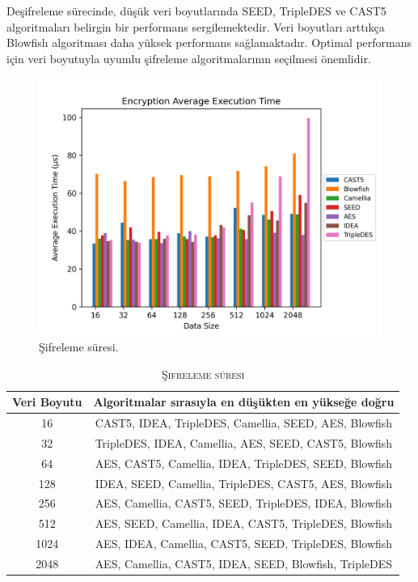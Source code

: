 \documentclass[conference, a4paper]{IEEEtran}
\begin{document}
    Deşifreleme sürecinde, düşük veri boyutlarında SEED, TripleDES ve CAST5 algoritmaları belirgin bir performans sergilemektedir. Veri boyutları arttıkça Blowfish algoritması daha yüksek performans sağlamaktadır. Optimal performans için veri boyutuyla uyumlu şifreleme algoritmalarının seçilmesi önemlidir.

    \begin{figure}[H]
    \centering
    \shorthandoff{=}  
    \includegraphics[scale=0.52]{fig7.png}
    \shorthandon{=} 
    \caption{Şifreleme süresi.}
    \label{sekil7}
    \end{figure}

    \begin{table}[h]
        \centering
        \caption{\textsc{Şifreleme süresi}}
        \label{tablo4}
        \begin{tabular}{|c|c|}
            \hline
                Veri Boyutu & Algoritmalar sırasıyla en düşükten en yükseğe doğru \\
            \hline
            16 & CAST5, IDEA, TripleDES, Camellia, SEED, AES, Blowfish \\
            \hline
            32 & TripleDES, IDEA, Camellia, AES, SEED, CAST5, Blowfish \\
            \hline
            64 & AES, CAST5, Camellia, IDEA, TripleDES, SEED, Blowfish \\
            \hline
            128 & IDEA, SEED, Camellia, TripleDES, CAST5, AES, Blowfish \\
            \hline
            256 & AES, Camellia, CAST5, SEED, TripleDES, IDEA, Blowfish \\
            \hline
            512 & AES, SEED, Camellia, IDEA, CAST5, TripleDES, Blowfish \\
            \hline
            1024 & AES, IDEA, Camellia, CAST5, SEED, TripleDES, Blowfish \\
            \hline
            2048 & AES, Camellia, CAST5, IDEA, SEED, Blowfish, TripleDES \\
            \hline
        \end{tabular}
    \end{table}    
\end{document}
